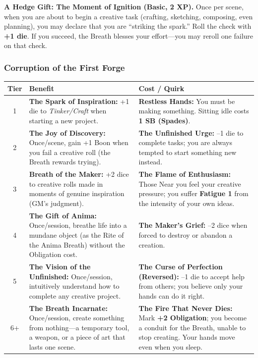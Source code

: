 \textbf{A Hedge Gift: The Moment of Ignition (Basic, 2 XP).} Once per scene, when you are about to begin a creative task (crafting, sketching, composing, even planning), you may declare that you are ``striking the spark.'' Roll the check with \textbf{+1 die}. If you succeed, the Breath blesses your effort---you may reroll one failure on that check.

\subsubsection*{Corruption of the First Forge}
\begin{tabular}{|c|p{6cm}|p{6cm}|}
\hline
\rowcolor{gray!30}\textbf{Tier} & \textbf{Benefit} & \textbf{Cost / Quirk} \\
\hline
1 & \textbf{The Spark of Inspiration:} +1 die to \textit{Tinker/Craft} when starting a new project. & \textbf{Restless Hands:} You must be making something. Sitting idle costs \textbf{1 SB (Spades)}. \\
\hline
2 & \textbf{The Joy of Discovery:} Once/scene, gain +1 Boon when you fail a creative roll (the Breath rewards trying). & \textbf{The Unfinished Urge:} --1 die to complete tasks; you are always tempted to start something new instead. \\
\hline
3 & \textbf{Breath of the Maker:} +2 dice to creative rolls made in moments of genuine inspiration (GM's judgment). & \textbf{The Flame of Enthusiasm:} Those Near you feel your creative pressure; you suffer \textbf{Fatigue 1} from the intensity of your own ideas. \\
\hline
4 & \textbf{The Gift of Anima:} Once/session, breathe life into a mundane object (as the Rite of the Anima Breath) without the Obligation cost. & \textbf{The Maker's Grief:} --2 dice when forced to destroy or abandon a creation. \\
\hline
5 & \textbf{The Vision of the Unfinished:} Once/session, intuitively understand how to complete any creative project. & \textbf{The Curse of Perfection (Reversed):} --1 die to accept help from others; you believe only your hands can do it right. \\
\hline
6+ & \textbf{The Breath Incarnate:} Once/session, create something from nothing---a temporary tool, a weapon, or a piece of art that lasts one scene. & \textbf{The Fire That Never Dies:} Mark \textbf{+2 Obligation}; you become a conduit for the Breath, unable to stop creating. Your hands move even when you sleep. \\
\hline
\end{tabular}

